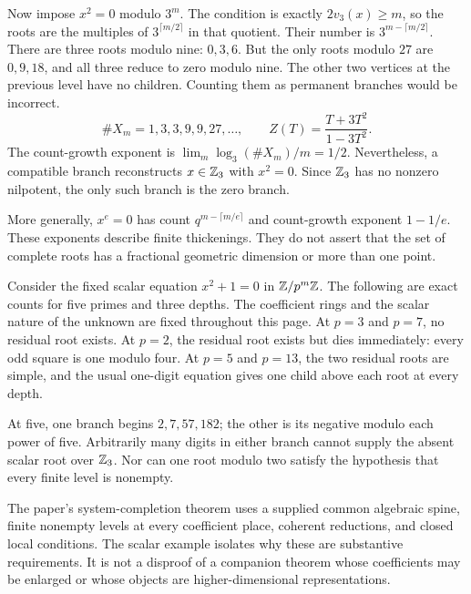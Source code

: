 Now impose $x^2=0$ modulo $3^m$. The condition is exactly $2v_3(x)\ge m$, so the roots are the multiples of $3^{\lceil m/2\rceil}$ in that quotient. Their number is $3^{m-\lceil m/2\rceil}$.
There are three roots modulo nine: $0,3,6$. But the only roots modulo $27$ are $0,9,18$, and all three reduce to zero modulo nine. The other two vertices at the previous level have no children. Counting them as permanent branches would be incorrect.
\[
\#X_m=1,3,3,9,9,27,\ldots,
\qquad Z(T)=\frac{T+3T^2}{1-3T^2}.
\]
The count-growth exponent is $\lim_m\log_3(\#X_m)/m=1/2$. Nevertheless, a compatible branch reconstructs $x\in\mathbb Z_3$ with $x^2=0$. Since $\mathbb Z_3$ has no nonzero nilpotent, the only such branch is the zero branch.

More generally, $x^e=0$ has count $q^{m-\lceil m/e\rceil}$ and count-growth exponent $1-1/e$. These exponents describe finite thickenings. They do not assert that the set of complete roots has a fractional geometric dimension or more than one point.

Consider the fixed scalar equation $x^2+1=0$ in $\mathbb Z/p^m\mathbb Z$. The following are exact counts for five primes and three depths. The coefficient rings and the scalar nature of the unknown are fixed throughout this page.
At $p=3$ and $p=7$, no residual root exists. At $p=2$, the residual root exists but dies immediately: every odd square is one modulo four. At $p=5$ and $p=13$, the two residual roots are simple, and the usual one-digit equation gives one child above each root at every depth.

At five, one branch begins $2,7,57,182$; the other is its negative modulo each power of five. Arbitrarily many digits in either branch cannot supply the absent scalar root over $\mathbb Z_3$. Nor can one root modulo two satisfy the hypothesis that every finite level is nonempty.

The paper's system-completion theorem uses a supplied common algebraic spine, finite nonempty levels at every coefficient place, coherent reductions, and closed local conditions. The scalar example isolates why these are substantive requirements. It is not a disproof of a companion theorem whose coefficients may be enlarged or whose objects are higher-dimensional representations.

